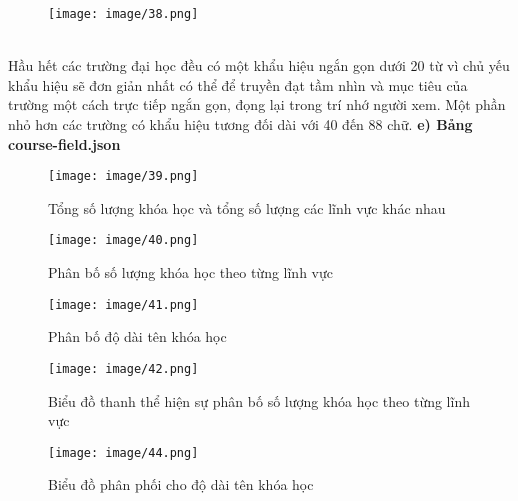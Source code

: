 \begin{figure}[h]
    \centering
    \texttt{[image: image/38.png]}
\end{figure}\\
Hầu hết các trường đại học đều có một khẩu hiệu ngắn gọn dưới 20 từ vì chủ yếu khẩu hiệu sẽ đơn giản nhất có thể để truyền đạt tầm nhìn và mục tiêu của trường một cách trực tiếp ngắn gọn, đọng lại trong trí nhớ người xem. Một phần nhỏ hơn các trường có khẩu hiệu tương đối dài với 40 đến 88 chữ. 
\newpage
\textbf{e) Bảng course-field.json}
\begin{figure}[h]
    \centering
    \texttt{[image: image/39.png]}
    \caption{Tổng số lượng khóa học và tổng số lượng các lĩnh vực khác nhau}
\end{figure}
\begin{figure}[h]
    \centering
    \texttt{[image: image/40.png]}
    \caption{Phân bố số lượng khóa học theo từng lĩnh vực}
\end{figure}
\newpage
\begin{figure}
    \centering
    \texttt{[image: image/41.png]}
    \caption{Phân bố độ dài tên khóa học}
\end{figure}
\begin{figure}[h]
    \centering
    \texttt{[image: image/42.png]}
    \caption{Biểu đồ thanh thể hiện sự phân bố số lượng khóa học theo từng lĩnh vực}
\end{figure}
\newpage
\begin{figure}
    \centering
    \texttt{[image: image/44.png]}
    \caption{Biểu đồ phân phối cho độ dài tên khóa học}
\end{figure}
